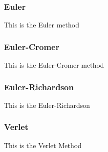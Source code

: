 \documentclass[11pt]{article}
\begin{document}
    \subsubsection{Euler}
    This is the Euler method

    \subsubsection{Euler-Cromer}
    This is the Euler-Cromer method

    \subsubsection{Euler-Richardson}
    This is the Euler-Richardson

    \subsubsection{Verlet}
    This is the Verlet Method

    
    
\end{document}
